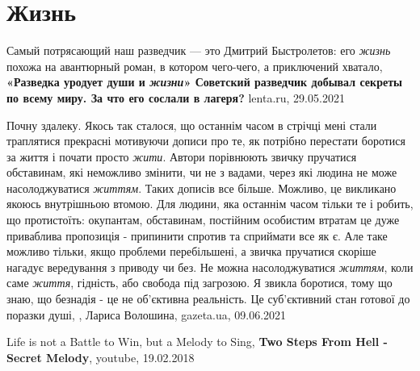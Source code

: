  
 
 
 
 
\chapter{Жизнь}

Самый потрясающий наш разведчик — это Дмитрий Быстролетов: его \emph{жизнь}
похожа на авантюрный роман, в котором чего-чего, а приключений хватало,
\textbf{«Разведка уродует души и \emph{жизни}» Советский разведчик добывал
секреты по всему миру. За что его сослали в лагеря?} lenta.ru, 29.05.2021

Почну здалеку. Якось так сталося, що останнім часом в стрічці мені стали
траплятися прекрасні мотивуючи дописи про те, як потрібно перестати боротися за
життя і почати просто \emph{жити}. Автори порівнюють звичку пручатися обставинам, які
неможливо змінити, чи не з вадами, через які людина не може насолоджуватися
\emph{життям}. Таких дописів все більше. Можливо, це викликано якоюсь внутрішньою
втомою. Для людини, яка останнім часом тільки те і робить, що протистоїть:
окупантам, обставинам, постійним особистим втратам це дуже приваблива
пропозиція - припинити спротив та сприймати все як є. Але таке можливо тільки,
якщо проблеми перебільшені, а звичка пручатися скоріше нагадує вередування з
приводу чи без. Не можна насолоджуватися \emph{життям}, коли саме \emph{життя}, гідність, або
свобода під загрозою. Я звикла боротися, тому що знаю, що безнадія - це не
об'єктивна реальність. Це суб'єктивний стан готової до поразки душі,
, Лариса Волошина, gazeta.ua, 09.06.2021

Life is not a Battle to Win, but a Melody to Sing,
\textbf{Two Steps From Hell - Secret Melody},
youtube, 19.02.2018

